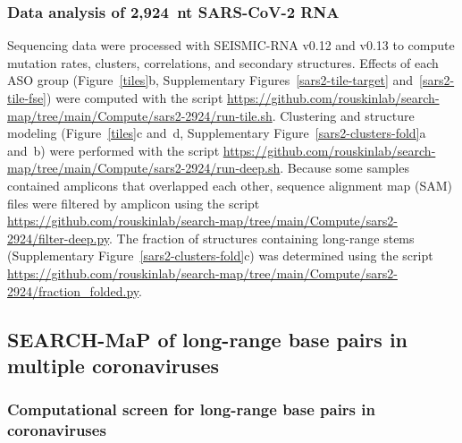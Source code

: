 \documentclass[main.tex]{subfiles}
\begin{document}
\subsubsection{Data analysis of 2,924~nt SARS-CoV-2 RNA}

Sequencing data were processed with SEISMIC-RNA v0.12 and v0.13 to compute mutation rates, clusters, correlations, and secondary structures.
Effects of each ASO group (Figure~\ref{tiles}b, Supplementary Figures~\ref{sars2-tile-target} and~\ref{sars2-tile-fse}) were computed with the script \url{https://github.com/rouskinlab/search-map/tree/main/Compute/sars2-2924/run-tile.sh}.
Clustering and structure modeling (Figure~\ref{tiles}c and~d, Supplementary Figure~\ref{sars2-clusters-fold}a and~b) were performed with the script \url{https://github.com/rouskinlab/search-map/tree/main/Compute/sars2-2924/run-deep.sh}.
Because some samples contained amplicons that overlapped each other, sequence alignment map (SAM) files were filtered by amplicon using the script \url{https://github.com/rouskinlab/search-map/tree/main/Compute/sars2-2924/filter-deep.py}.
The fraction of structures containing long-range stems (Supplementary Figure~\ref{sars2-clusters-fold}c) was determined using the script \url{https://github.com/rouskinlab/search-map/tree/main/Compute/sars2-2924/fraction_folded.py}.


\subsection{SEARCH-MaP of long-range base pairs in multiple coronaviruses}

\subsubsection{Computational screen for long-range base pairs in coronaviruses}
\label{screen_lri_comp}
\end{document}
